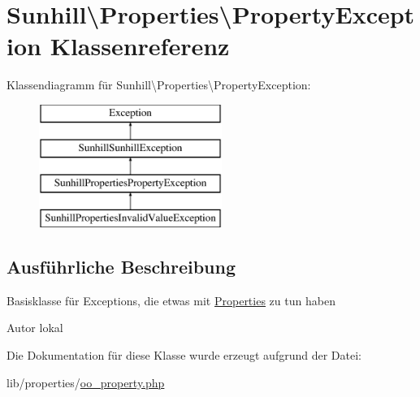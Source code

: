 \hypertarget{classSunhill_1_1Properties_1_1PropertyException}{}\section{Sunhill\textbackslash{}Properties\textbackslash{}Property\+Exception Klassenreferenz}
\label{classSunhill_1_1Properties_1_1PropertyException}
Klassendiagramm für Sunhill\textbackslash{}Properties\textbackslash{}Property\+Exception\+:\begin{figure}[H]
\begin{center}
\leavevmode
\includegraphics[height=4.000000cm]{d7/de1/classSunhill_1_1Properties_1_1PropertyException}
\end{center}
\end{figure}


\subsection{Ausführliche Beschreibung}
Basisklasse für Exceptions, die etwas mit \hyperlink{namespaceSunhill_1_1Properties}{Properties} zu tun haben \begin{DoxyAuthor}{Autor}
lokal 
\end{DoxyAuthor}


Die Dokumentation für diese Klasse wurde erzeugt aufgrund der Datei\+:\begin{DoxyCompactItemize}
\item 
lib/properties/\hyperlink{oo__property_8php}{oo\+\_\+property.\+php}\end{DoxyCompactItemize}
